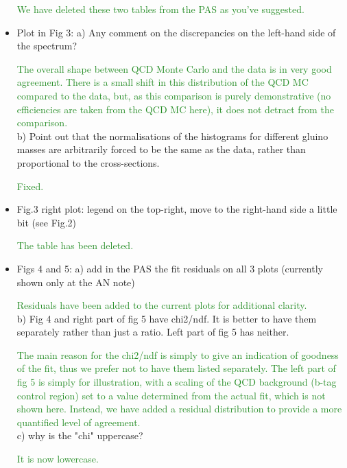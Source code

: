 \documentclass[paper=a4, fontsize=11pt]{scrartcl}
\begin{document}
\begin{itemize}
\textcolor{ForestGreen}{We have deleted these two tables from the PAS as you've suggested.}\\


\item Plot in Fig 3: 
a) Any comment on the discrepancies on the left-hand side of the spectrum? 

\textcolor{ForestGreen}{The overall shape between QCD Monte Carlo and the
data is in very good agreement. There is a small shift in this distribution of the
QCD MC compared to the data, but, as this comparison is purely demonstrative
(no efficiencies are taken from the QCD MC here), it does not detract from
the comparison.}\\


b) Point out that the normalisations of the histograms for different gluino 
masses are arbitrarily forced to be the same as the data, rather than 
proportional to the cross-sections. 

\textcolor{ForestGreen}{Fixed.}\\


\item Fig.3 
right plot: legend on the top-right, move to the right-hand side a little 
bit (see Fig.2) 

\textcolor{ForestGreen}{The table has been deleted.}\\


\item Figs 4 and 5: 
a) add in the PAS the fit residuals on all 3 plots (currently shown only at 
the AN note) 

\textcolor{ForestGreen}{Residuals have been added to the current plots for additional clarity.}\\


b) Fig 4 and right part of fig 5 have chi2/ndf. It is better to have them 
separately rather than just a ratio. Left part of fig 5 has neither. 

\textcolor{ForestGreen}{The main reason for the chi2/ndf is simply to give an
indication of goodness of the fit, thus we prefer not to have them listed separately.
The left part of fig 5 is simply for illustration, with a scaling of the QCD background
(b-tag control region) set to a value determined from the actual fit, which
is not shown here. Instead, we have added a residual distribution to provide
a more quantified level of agreement.}\\


c) why is the "chi" uppercase? 

\textcolor{ForestGreen}{It is now lowercase.}\\



\end{itemize}
\end{document}
